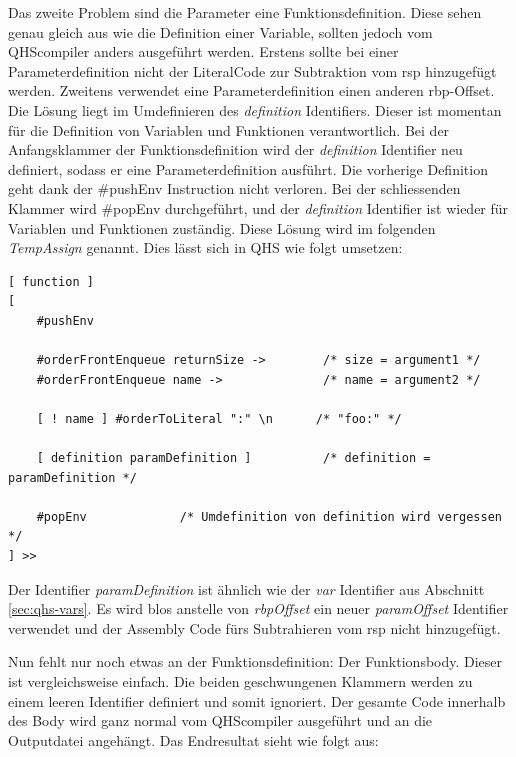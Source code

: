 Das zweite Problem sind die Parameter eine Funktionsdefinition. Diese sehen genau gleich aus wie die Definition einer Variable, sollten jedoch vom QHScompiler anders ausgeführt werden.
Erstens sollte bei einer Parameterdefinition nicht der LiteralCode zur Subtraktion vom rsp hinzugefügt werden. Zweitens verwendet eine Parameterdefinition einen anderen rbp-Offset.
Die Lösung liegt im Umdefinieren des \textit{definition} Identifiers. Dieser ist momentan für die Definition von Variablen und Funktionen verantwortlich.
Bei der Anfangsklammer der Funktionsdefinition wird der \textit{definition} Identifier neu definiert, sodass er eine Parameterdefinition ausführt. Die vorherige Definition geht dank der \#pushEnv Instruction nicht verloren.
Bei der schliessenden Klammer wird \#popEnv durchgeführt, und der \textit{definition} Identifier ist wieder für Variablen und Funktionen zuständig. Diese Lösung wird im folgenden \textit{TempAssign} genannt.
Dies lässt sich in QHS wie folgt umsetzen:

\begin{minipage}{\linewidth}
\begin{lstlisting}[language=QHS, caption=Implementation eines TempAssigns für Parameter Definitionen]
[ function ]
[
    #pushEnv

    #orderFrontEnqueue returnSize ->        /* size = argument1 */
    #orderFrontEnqueue name ->              /* name = argument2 */

    [ ! name ] #orderToLiteral ":" \n      /* "foo:" */

    [ definition paramDefinition ]          /* definition = paramDefinition */

    #popEnv             /* Umdefinition von definition wird vergessen */
] >>
\end{lstlisting}
\end{minipage}

Der Identifier \textit{paramDefinition} ist ähnlich wie der \textit{var} Identifier aus Abschnitt \ref{sec:qhs-vars}.
Es wird blos anstelle von \textit{rbpOffset} ein neuer \textit{paramOffset} Identifier verwendet und der Assembly Code fürs Subtrahieren vom rsp nicht hinzugefügt.

Nun fehlt nur noch etwas an der Funktionsdefinition: Der Funktionsbody. Dieser ist vergleichsweise einfach. Die beiden geschwungenen Klammern werden zu einem leeren Identifier definiert und somit ignoriert.
Der gesamte Code innerhalb des Body wird ganz normal vom QHScompiler ausgeführt und an die Outputdatei angehängt. Das Endresultat sieht wie folgt aus:

